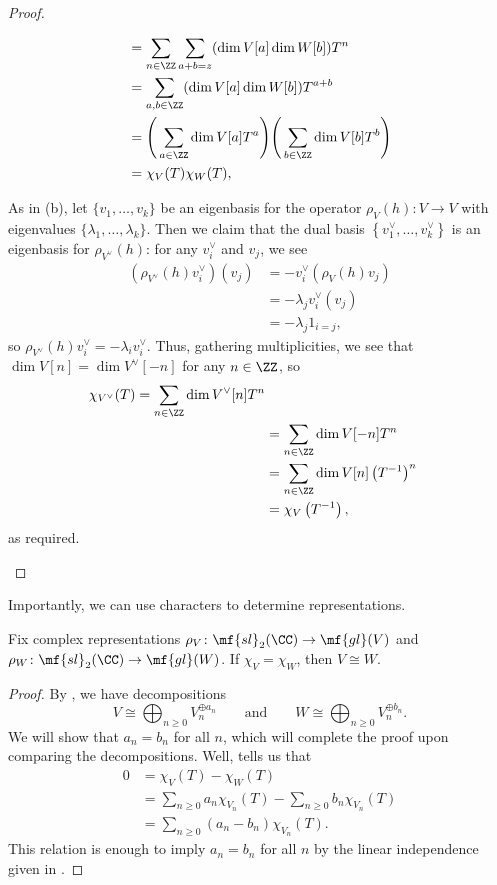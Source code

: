 \documentclass[../notes.tex]{subfiles}
\begin{document}
\begin{proof}
\begin{listalph}
\begin{align*}
			&= \sum_{n\in\ZZ}\sum_{a+b=z}(\dim V[a]\dim W[b])T^n \\
			&= \sum_{a,b\in\ZZ}(\dim V[a]\dim W[b])T^{a+b} \\
			&= \Bigg(\sum_{a\in\ZZ}\dim V[a]T^a\Bigg)\Bigg(\sum_{b\in\ZZ}\dim V[b]T^b\Bigg) \\
			&= \chi_V(T)\chi_W(T),
		\end{align*}
		\item As in (b), let $\{v_1,\ldots,v_k\}$ be an eigenbasis for the operator $\rho_V(h)\colon V\to V$ with eigenvalues $\{\lambda_1,\ldots,\lambda_k\}$. Then we claim that the dual basis $\left\{v_1^\lor,\ldots,v_k^\lor\right\}$ is an eigenbasis for $\rho_{V^\lor}(h)$: for any $v_i^\lor$ and $v_j$, we see
		\begin{align*}
			\left(\rho_{V^\lor}(h)v_i^\lor\right)(v_j) &= -v_i^\lor\left(\rho_V(h)v_j\right) \\
			&= -\lambda_jv_i^\lor(v_j) \\
			&= -\lambda_j1_{i=j},
		\end{align*}
		so $\rho_{V^\lor}(h)v_i^\lor=-\lambda_iv_i^\lor$. Thus, gathering multiplicities, we see that $\dim V[n]=\dim V^\lor[-n]$ for any $n\in\ZZ$, so
		\begin{align*}
			\chi_{V^\lor}(T)=\sum_{n\in\ZZ}\dim V^\lor[n]T^n \\
			&= \sum_{n\in\ZZ}\dim V[-n]T^n \\
			&= \sum_{n\in\ZZ}\dim V[n]\left(T^{-1}\right)^n \\
			&= \chi_V\left(T^{-1}\right),
		\end{align*}
		as required.
		\qedhere
	\end{listalph}
\end{proof}
Importantly, we can use characters to determine representations.
\begin{proposition} \label{prop:sl2-char-determines}
	Fix complex representations $\rho_V\colon\mf{sl}_2(\CC)\to\mf{gl}(V)$ and $\rho_W\colon\mf{sl}_2(\CC)\to\mf{gl}(W)$. If $\chi_V=\chi_W$, then $V\cong W$.
\end{proposition}
\begin{proof}
	By , we have decompositions
	\[V\cong\bigoplus_{n\ge0}V_n^{\oplus a_n}\qquad\text{and}\qquad W\cong\bigoplus_{n\ge0}V_n^{\oplus b_n}.\]
	We will show that $a_n=b_n$ for all $n$, which will complete the proof upon comparing the decompositions. Well,  tells us that
	\begin{align*}
		0 &= \chi_V(T)-\chi_W(T) \\
		&= \sum_{n\ge0}a_n\chi_{V_n}(T)-\sum_{n\ge0}b_n\chi_{V_n}(T) \\
		&= \sum_{n\ge0}(a_n-b_n)\chi_{V_n}(T).
	\end{align*}
	This relation is enough to imply $a_n=b_n$ for all $n$ by the linear independence given in .
\end{proof}
\end{document}
